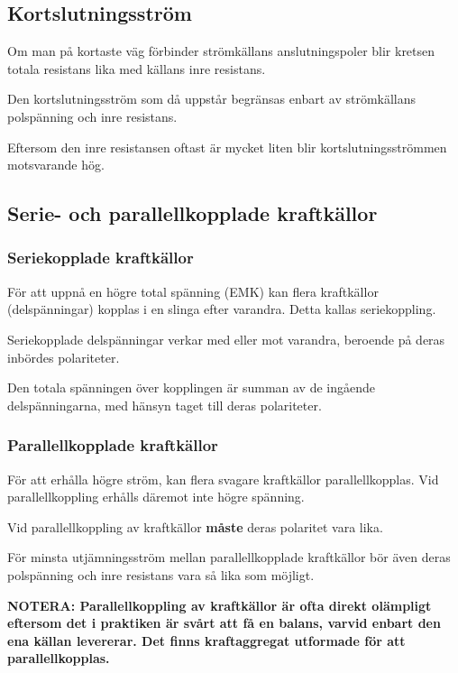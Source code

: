 \subsection{Kortslutningsström}

Om man på kortaste väg förbinder strömkällans anslutningspoler blir kretsen
totala resistans lika med källans inre resistans.

Den kortslutningsström som då uppstår begränsas enbart av strömkällans
polspänning och inre resistans.

Eftersom den inre resistansen oftast är mycket liten blir kortslutningsströmmen
motsvarande hög.

\subsection{Serie- och parallellkopplade kraftkällor}

\subsubsection{Seriekopplade kraftkällor}

För att uppnå en högre total spänning (EMK) kan flera kraftkällor
(delspänningar) kopplas i en slinga efter varandra. Detta kallas seriekoppling.

Seriekopplade delspänningar verkar med eller mot varandra, beroende på
deras inbördes polariteter.

Den totala spänningen över kopplingen är summan av de ingående
delspänningarna, med hänsyn taget till deras polariteter.

\subsubsection{Parallellkopplade kraftkällor}

För att erhålla högre ström, kan flera svagare kraftkällor parallellkopplas.
Vid parallellkoppling erhålls däremot inte högre spänning.

Vid parallellkoppling av kraftkällor \textbf{måste} deras polaritet vara lika.

För minsta utjämningsström mellan parallellkopplade kraftkällor bör även deras
polspänning och inre resistans vara så lika som möjligt.

\textbf{NOTERA: Parallellkoppling av kraftkällor är ofta direkt o\-läm\-p\-li\-gt eftersom det
i praktiken är svårt att få en balans, varvid enbart den ena källan levererar.
Det finns kraftaggregat utformade för att parallellkopplas.}
